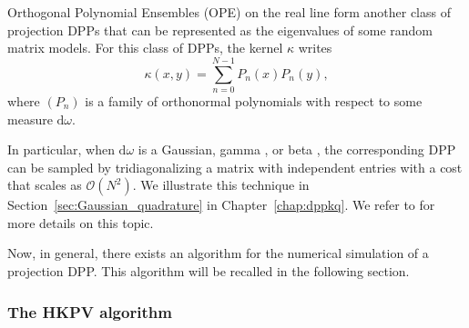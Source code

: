 \documentclass[twoside,11pt]{book}
\numberwithin{theorem}{chapter}
\numberwithin{definition}{chapter}
\numberwithin{proposition}{chapter}
\numberwithin{corollary}{chapter}
\numberwithin{example}{chapter}
\numberwithin{lemma}{chapter}
\numberwithin{assumption}{chapter}
\DeclareMathOperator{\Det}{Det}
\DeclareMathOperator{\Prb}{\mathbb{P}}
\DeclareMathOperator*{\KDPP}{\mathfrak{K}}
\DeclareMathOperator{\X}{\mathcal{X}}
\begin{document}
Orthogonal Polynomial Ensembles (OPE) on the real line form another class of projection DPPs that can be represented as the eigenvalues of some random matrix models. For this class of DPPs, the kernel $\kappa$ writes
\begin{equation}
\kappa(x,y) = \sum\limits_{n =0}^{N-1} P_{n}(x)P_{n}(y),
\end{equation}
where $(P_{n})$ is a family of orthonormal polynomials with respect to some measure $\mathrm{d}\omega$.

In particular, when $\mathrm{d}\omega$ is a Gaussian, gamma \cite{DuEd02}, or beta \cite{KiNe04}, the corresponding DPP can be sampled by tridiagonalizing a matrix with independent entries with a cost that scales as $\mathcal{O}(N^2)$.
We illustrate this technique in Section~\ref{sec:Gaussian_quadrature} in Chapter~\ref{chap:dppkq}. We refer to \citep{GaBaVa20} for more details on this topic.

Now, in general, there exists an algorithm for the numerical simulation of a projection DPP. This algorithm will be recalled in the following section.





\subsubsection{The HKPV algorithm}
 

\end{document}
